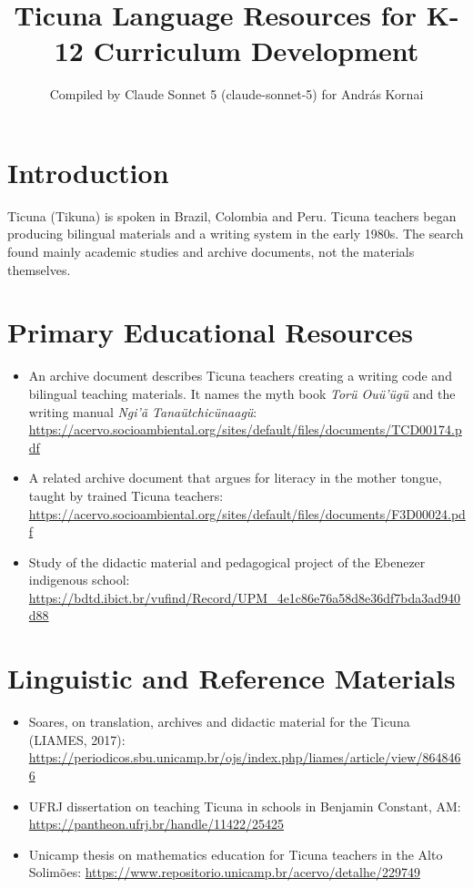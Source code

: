 \documentclass[12pt]{article}
\title{Ticuna Language Resources for K-12 Curriculum Development}
\author{Compiled by Claude Sonnet 5 (claude-sonnet-5) for Andr\'as Kornai}
\date{}
\begin{document}
\maketitle

\section{Introduction}
Ticuna (Tikuna) is spoken in Brazil, Colombia and Peru. Ticuna teachers began producing bilingual materials and a writing system in the early 1980s. The search found mainly academic studies and archive documents, not the materials themselves.

\section{Primary Educational Resources}
\begin{itemize}
\item An archive document describes Ticuna teachers creating a writing code and bilingual teaching materials. It names the myth book \emph{Tor\"u Ou\"u'\"ug\"u} and the writing manual \emph{Ngi'\~a Tana\"utchic\"unaag\"u}: \url{https://acervo.socioambiental.org/sites/default/files/documents/TCD00174.pdf}
\item A related archive document that argues for literacy in the mother tongue, taught by trained Ticuna teachers: \url{https://acervo.socioambiental.org/sites/default/files/documents/F3D00024.pdf}
\item Study of the didactic material and pedagogical project of the Ebenezer indigenous school: \url{https://bdtd.ibict.br/vufind/Record/UPM_4e1c86e76a58d8e36df7bda3ad940d88}
\end{itemize}

\section{Linguistic and Reference Materials}
\begin{itemize}
\item Soares, on translation, archives and didactic material for the Ticuna (LIAMES, 2017): \url{https://periodicos.sbu.unicamp.br/ojs/index.php/liames/article/view/8648466}
\item UFRJ dissertation on teaching Ticuna in schools in Benjamin Constant, AM: \url{https://pantheon.ufrj.br/handle/11422/25425}
\item Unicamp thesis on mathematics education for Ticuna teachers in the Alto Solim\~oes: \url{https://www.repositorio.unicamp.br/acervo/detalhe/229749}
\end{itemize}
\end{document}
